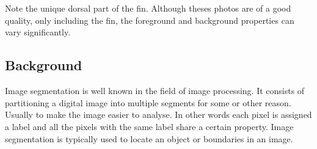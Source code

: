 \documentclass[a4paper,10pt]{article}
\begin{document}
\begin{figure}[H]
\centering
\mbox{ \quad
{} \quad
{}}
\end{figure}

\begin{figure}[H]
\centering
\mbox{ \quad
{} \quad
{}}
\end{figure}

Note the unique dorsal part of the fin.  Although theses photos are of a good
quality, only including the fin, the foreground and background properties can
vary significantly.


\subsection{Background}
Image segmentation is well known in the field of image processing.  It consists
of partitioning a digital image into multiple segments for some or other reason.
 Usually to make the image easier to analyse.  In other words each pixel is
assigned a label and all the pixels with the same label share a certain
property.  Image segmentation is typically used to locate an object or
boundaries in an image. 
\end{document}

